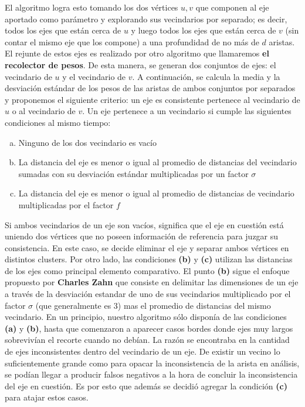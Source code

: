 \vskip 8pt

El algoritmo logra esto tomando los dos vértices $u, v$ que componen al eje aportado como parámetro y explorando sus vecindarios por separado; es decir, todos los ejes que están cerca de $u$ y luego todos los ejes que están cerca de $v$ (sin contar el mismo eje que los compone) a una profundidad de no más de $d$ aristas. El rejunte de estos ejes es realizado por otro algoritmo que llamaremos \textbf{el recolector de pesos}. De esta manera, se generan dos conjuntos de ejes: el vecindario de $u$ y el vecindario de $v$. A continuación, se calcula la media y la desviación estándar de los pesos de las aristas de ambos conjuntos por separados y proponemos el siguiente criterio: un eje es consistente pertenece al vecindario de $u$ o al vecindario de $v$. Un eje pertenece a un vecindario si cumple las siguientes condiciones al mismo tiempo:
\begin{enumerate}[a)]
	\item Ninguno de los dos vecindario es vacío
	\item La distancia del eje es menor o igual al promedio de distancias del vecindario sumadas con su desviación estándar multiplicadas por un factor $\sigma$
	\item La distancia del eje es menor o igual al promedio de distancias de vecindario multiplicadas por el factor $f$
\end{enumerate}

Si ambos vecindarios de un eje son vacíos, significa que el eje en cuestión está uniendo dos vértices que no poseen información de referencia para juzgar su consistencia. En este caso, se decide eliminar el eje y separar ambos vértices en distintos clusters. Por otro lado, las condiciones \textbf{(b)} y \textbf{(c)} utilizan las distancias de los ejes como principal elemento comparativo. El punto \textbf{(b)} sigue el enfoque propuesto por \textbf{Charles Zahn} que consiste en delimitar las dimensiones de un eje a través de la desviación estandar de uno de sus vecindarios multiplicado por el factor $\sigma$ (que generalmente es $3$) mas el promedio de distancias del mismo vecindario. En un principio, nuestro algoritmo sólo disponía de las condiciones \textbf{(a)} y \textbf{(b)}, hasta que comenzaron a aparecer casos bordes donde ejes muy largos sobrevivían el recorte cuando no debían. La razón se encontraba en la cantidad de ejes inconsistentes dentro del vecindario de un eje. De existir un vecino lo suficientemente grande como para opacar la inconsistencia de la arista en análisis, se podían llegar a producir falsos negativos a la hora de concluir la inconsistencia del eje en cuestión. Es por esto que además se decidió agregar la condición \textbf{(c)} para atajar estos casos.

